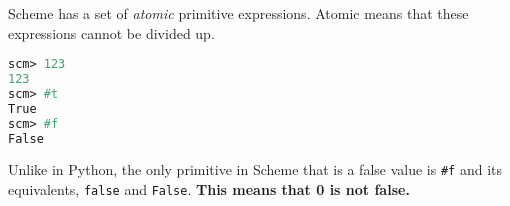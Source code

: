 Scheme has a set of \emph{atomic} primitive expressions. Atomic means
that these expressions cannot be divided up.

\begin{blocksection}
\begin{lstlisting}[language=Scheme]
scm> 123
123
scm> #t
True
scm> #f
False
\end{lstlisting}
\end{blocksection}

Unlike in Python, the only primitive in Scheme that is a false value is
\lstinline{#f} and its equivalents, \lstinline{false} and \lstinline{False}. \textbf{This means that 0 is not false.}
